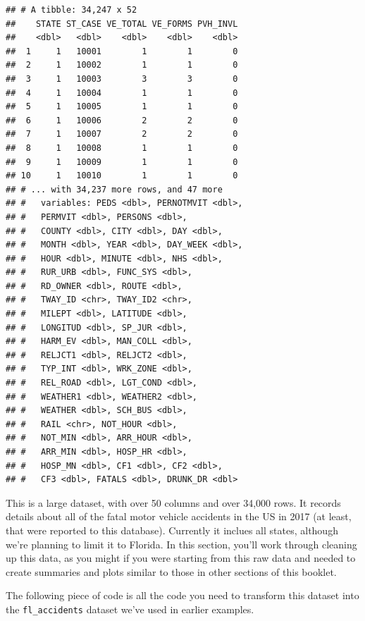 \documentclass[]{tufte-book}
\begin{document}
\begin{verbatim}
## # A tibble: 34,247 x 52
##    STATE ST_CASE VE_TOTAL VE_FORMS PVH_INVL
##    <dbl>   <dbl>    <dbl>    <dbl>    <dbl>
##  1     1   10001        1        1        0
##  2     1   10002        1        1        0
##  3     1   10003        3        3        0
##  4     1   10004        1        1        0
##  5     1   10005        1        1        0
##  6     1   10006        2        2        0
##  7     1   10007        2        2        0
##  8     1   10008        1        1        0
##  9     1   10009        1        1        0
## 10     1   10010        1        1        0
## # ... with 34,237 more rows, and 47 more
## #   variables: PEDS <dbl>, PERNOTMVIT <dbl>,
## #   PERMVIT <dbl>, PERSONS <dbl>,
## #   COUNTY <dbl>, CITY <dbl>, DAY <dbl>,
## #   MONTH <dbl>, YEAR <dbl>, DAY_WEEK <dbl>,
## #   HOUR <dbl>, MINUTE <dbl>, NHS <dbl>,
## #   RUR_URB <dbl>, FUNC_SYS <dbl>,
## #   RD_OWNER <dbl>, ROUTE <dbl>,
## #   TWAY_ID <chr>, TWAY_ID2 <chr>,
## #   MILEPT <dbl>, LATITUDE <dbl>,
## #   LONGITUD <dbl>, SP_JUR <dbl>,
## #   HARM_EV <dbl>, MAN_COLL <dbl>,
## #   RELJCT1 <dbl>, RELJCT2 <dbl>,
## #   TYP_INT <dbl>, WRK_ZONE <dbl>,
## #   REL_ROAD <dbl>, LGT_COND <dbl>,
## #   WEATHER1 <dbl>, WEATHER2 <dbl>,
## #   WEATHER <dbl>, SCH_BUS <dbl>,
## #   RAIL <chr>, NOT_HOUR <dbl>,
## #   NOT_MIN <dbl>, ARR_HOUR <dbl>,
## #   ARR_MIN <dbl>, HOSP_HR <dbl>,
## #   HOSP_MN <dbl>, CF1 <dbl>, CF2 <dbl>,
## #   CF3 <dbl>, FATALS <dbl>, DRUNK_DR <dbl>
\end{verbatim}

This is a large dataset, with over 50 columns and over 34,000 rows. It records details about all of
the fatal motor vehicle accidents in the US in 2017 (at least, that were reported to this database).
Currently it inclues all states, although we're planning to limit it to Florida.
In this section, you'll work through cleaning up this data, as you might if you were starting
from this raw data and needed to create summaries and plots similar to those in other sections of
this booklet.

The following piece of code is all the code you need to transform this dataset into the
\texttt{fl\_accidents} dataset we've used in earlier examples.
\end{document}
